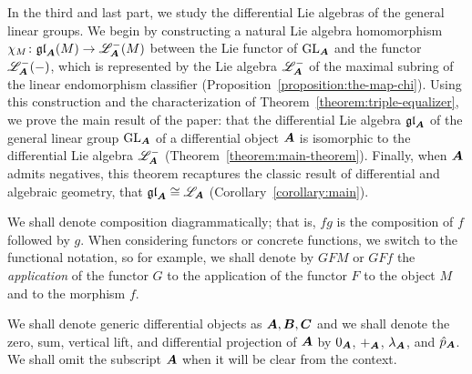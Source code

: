 \begin{content}
In the third and last part, we study the differential Lie algebras of the general linear groups. We begin by constructing a natural Lie algebra homomorphism $\chi_M\colon\mathfrak{gl}_{\bm{A}}(M)\to\mathscr{L}_{\bm{A}}^-(M)$ between the Lie functor of $\operatorname{GL}_{\bm{A}}$ and the functor $\mathscr{L}_{\bm{A}}^-(-)$, which is represented by the Lie algebra $\mathscr{L}_{\bm{A}}^-$ of the maximal subring of the linear endomorphism classifier (Proposition~\ref{proposition:the-map-chi}). Using this construction and the characterization of Theorem~\ref{theorem:triple-equalizer}, we prove the main result of the paper: that the differential Lie algebra $\mathfrak{gl}_{\bm{A}}$ of the general linear group $\operatorname{GL}_{\bm{A}}$ of a differential object ${\bm{A}}$ is isomorphic to the differential Lie algebra $\mathscr{L}_{\bm{A}}^-$ (Theorem~\ref{theorem:main-theorem}). Finally, when ${\bm{A}}$ admits negatives, this theorem recaptures the classic result of differential and algebraic geometry, that $\mathfrak{gl}_{\bm{A}}\cong\mathscr{L}_{\bm{A}}$ (Corollary~\ref{corollary:main}).
\end{content}

\begin{conventions}
We shall denote composition diagrammatically; that is, $fg$ is the composition of $f$ followed by $g$. When considering functors or concrete functions, we switch to the functional notation, so for example, we shall denote by $GFM$ or $GFf$ the \emph{application} of the functor $G$ to the application of the functor $F$ to the object $M$ and to the morphism $f$.

We shall denote generic differential objects as ${\bm{A}},{\bm{B}},{\bm{C}}$ and we shall denote the zero, sum, vertical lift, and differential projection of ${\bm{A}}$ by $0_{\bm{A}}$, $+_{\bm{A}}$, $\lambda_{\bm{A}}$, and $\hat p_{\bm{A}}$. We shall omit the subscript ${\bm{A}}$ when it will be clear from the context.
\end{conventions}



